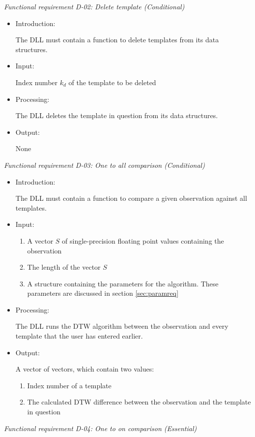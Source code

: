 \documentclass[a4paper,11pt]{article}
\begin{document}
\noindent \emph{Functional requirement D-02: Delete template (Conditional)}
\begin{itemize}
\item Introduction:

The DLL must contain a function to delete templates from its data structures.
\item Input:

Index number $k_d$ of the template to be deleted
\item Processing:

The DLL deletes the template in question from its data structures.
\item Output:

None
\end{itemize}


\noindent \emph{Functional requirement D-03: One to all comparison (Conditional)}
\begin{itemize}
\item Introduction:

The DLL must contain a function to compare a given observation against all templates.
\item Input:

\begin{enumerate}
\item A vector $S$ of single-precision floating point values containing the observation
\item The length of the vector $S$
\item A structure containing the parameters for the algorithm. These parameters are discussed in section \ref{sec:paramreq}
\end{enumerate}

\item Processing:

The DLL runs the DTW algorithm between the observation and every template that the user has entered earlier.
\item Output:

A vector of vectors, which contain two values:
\begin{enumerate}
\item Index number of a template
\item The calculated DTW difference between the observation and the template in question
\end{enumerate}
\end{itemize}

\noindent \emph{Functional requirement D-04: One to on comparison (Essential)} 
\end{document}
